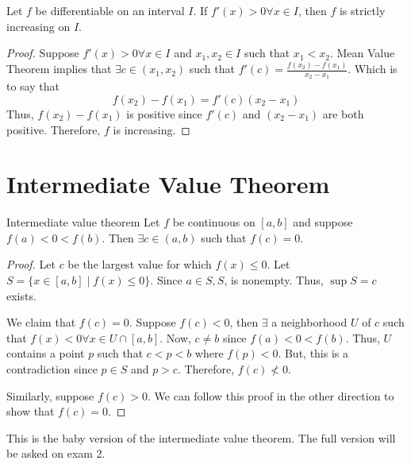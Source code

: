 \begin{theorem}
    Let $f$ be differentiable on an interval $I$. If $f'(x) > 0 \forall x \in I$, then $f$ is strictly increasing on $I$.
\end{theorem}
\begin{proof}
    Suppose $f'(x) > 0 \forall x \in I$ and $x_1, x_2 \in I$ such that $x_1 < x_2$. Mean Value Theorem implies that $\exists c \in (x_1, x_2)$ such that $f'(c) = \frac{f(x_2) - f(x_1)}{x_2 - x_1}$. Which is to say that $$f(x_2) - f(x_1) = f'(c) (x_2 - x_1)$$ Thus, $f(x_2) - f(x_1)$ is positive since $f'(c)$ and $(x_2 - x_1)$ are both positive. Therefore, $f$ is increasing.
\end{proof}

\section{Intermediate Value Theorem}
\begin{theorem}{Intermediate value theorem}{}
    Let $f$ be continuous on $[a,b]$ and suppose $f(a) < 0 < f(b)$. Then $\exists c \in (a,b)$ such that $f(c) = 0$.
\end{theorem}
\begin{proof}
    Let $c$ be the largest value for which $f(x) \leq 0$. Let $S = \{x \in [a, b] \mid f(x) \leq 0\}$. Since $a \in S, S$, is nonempty. Thus, $\sup S = c$ exists.

    We claim that $f(c) = 0$. Suppose $f(c) < 0$, then $\exists$ a neighborhood $U$ of $c$ such that $f(x) < 0 \forall x \in U \cap [a, b]$. Now, $c \neq b$ since $f(a) < 0 < f(b)$. Thus, $U$ contains a point $p$ such that $c < p < b$ where $f(p) < 0$. But, this is a contradiction since $p \in S$ and $p > c$. Therefore, $f(c) \not< 0$.

    Similarly, suppose $f(c) > 0$. We can follow this proof in the other direction to show that $f(c) = 0$.
\end{proof}
\begin{note}
    This is the baby version of the intermediate value theorem. The full version will be asked on exam 2.
\end{note}